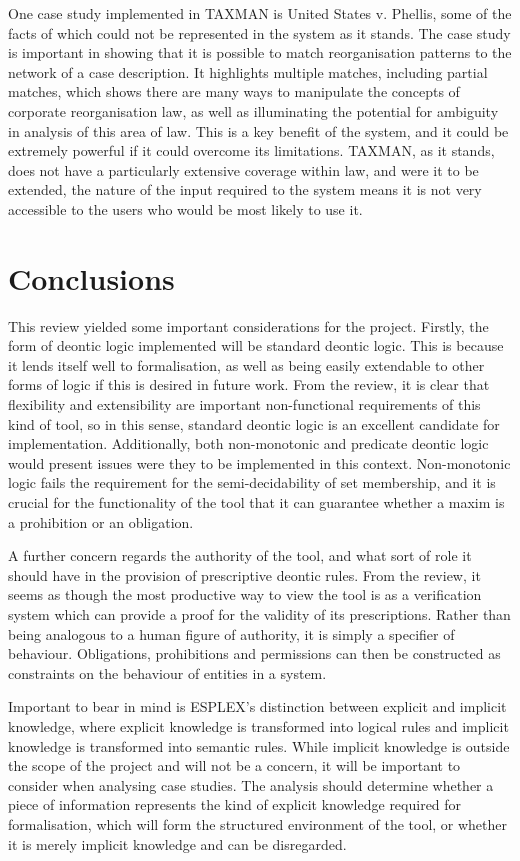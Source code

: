 \documentclass{l4proj}
\begin{document}
One case study implemented in TAXMAN is United States v. Phellis, some of the facts of which could not be represented in the system as it stands. The case study is important in showing that it is possible to match reorganisation patterns to the network of a case description. It highlights multiple matches, including partial matches, which shows there are many ways to manipulate the concepts of corporate reorganisation law, as well as illuminating the potential for ambiguity in analysis of this area of law. This is a key benefit of the system, and it could be extremely powerful if it could overcome its limitations. TAXMAN, as it stands, does not have a particularly extensive coverage within law, and were it to be extended, the nature of the input required to the system means it is not very accessible to the users who would be most likely to use it. 

\section{Conclusions}
This review yielded some important considerations for the project. Firstly, the form of deontic logic implemented will be standard deontic logic. This is because it lends itself well to formalisation, as well as being easily extendable to other forms of logic if this is desired in future work. From the review, it is clear that flexibility and extensibility are important non-functional requirements of this kind of tool, so in this sense, standard deontic logic is an excellent candidate for implementation. Additionally, both non-monotonic and predicate deontic logic would present issues were they to be implemented in this context. Non-monotonic logic fails the requirement for the semi-decidability of set membership, and it is crucial for the functionality of the tool that it can guarantee whether a maxim is a prohibition or an obligation. 

A further concern regards the authority of the tool, and  what sort of role it should have in the provision of prescriptive deontic rules. From the review, it seems as though the most productive way to view the tool is as a verification system which can provide a proof for the validity of its prescriptions. Rather than being analogous to a human figure of authority, it is simply a specifier of behaviour. Obligations, prohibitions and permissions can then be constructed as constraints on the behaviour of entities in a system. 

Important to bear in mind is ESPLEX's distinction between explicit and implicit knowledge, where explicit knowledge is transformed into logical rules and implicit knowledge is transformed into semantic rules. While implicit knowledge is outside the scope of the project and will not be a concern, it will be important to consider when analysing case studies. The analysis should determine whether a piece of information represents the kind of explicit knowledge required for formalisation, which will form the structured environment of the tool, or whether it is merely implicit knowledge and can be disregarded. 
\end{document}
